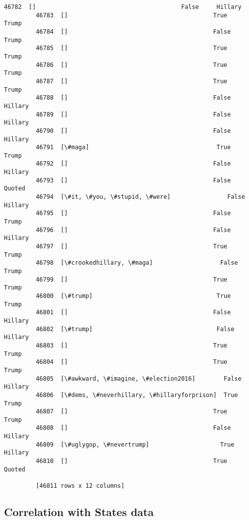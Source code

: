 \documentclass[11pt]{article}
\begin{document}
\begin{Verbatim}[commandchars=\\\{\}]
         46782  []                                         False     Hillary  
         46783  []                                         True      Trump    
         46784  []                                         False     Trump    
         46785  []                                         True      Trump    
         46786  []                                         True      Trump    
         46787  []                                         True      Trump    
         46788  []                                         False     Hillary  
         46789  []                                         False     Hillary  
         46790  []                                         False     Hillary  
         46791  [\#maga]                                    True      Trump    
         46792  []                                         False     Hillary  
         46793  []                                         False     Quoted   
         46794  [\#it, \#you, \#stupid, \#were]                False     Hillary  
         46795  []                                         False     Trump    
         46796  []                                         False     Hillary  
         46797  []                                         True      Trump    
         46798  [\#crookedhillary, \#maga]                   False     Trump    
         46799  []                                         True      Trump    
         46800  [\#trump]                                   True      Trump    
         46801  []                                         False     Hillary  
         46802  [\#trump]                                   False     Hillary  
         46803  []                                         True      Trump    
         46804  []                                         True      Trump    
         46805  [\#awkward, \#imagine, \#election2016]        False     Hillary  
         46806  [\#dems, \#neverhillary, \#hillaryforprison]  True      Trump    
         46807  []                                         True      Trump    
         46808  []                                         False     Hillary  
         46809  [\#uglygop, \#nevertrump]                    True      Hillary  
         46810  []                                         True      Quoted   
         
         [46811 rows x 12 columns]
\end{Verbatim}
            
    \subsection{Correlation with States
data}\label{correlation-with-states-data}
\end{document}
